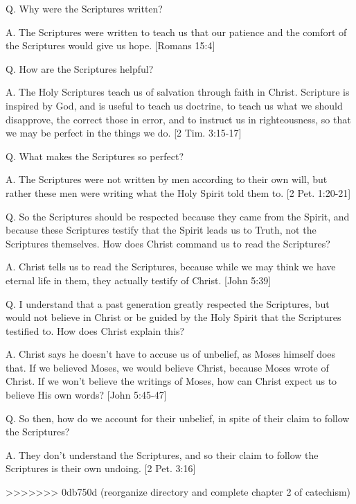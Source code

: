 \documentclass[../main.tex]{subfiles}
\begin{document}
	Q. Why were the Scriptures written?
	
	A. The Scriptures were written to teach us that our patience and the comfort of the Scriptures would give us hope. [Romans 15:4]
	
	Q. How are the Scriptures helpful?
	
	A. The Holy Scriptures teach us of salvation through faith in Christ. Scripture is inspired by God, and is useful to teach us doctrine, to teach us what we should disapprove, the correct those in error, and to instruct us in righteousness, so that we may be perfect in the things we do. [2 Tim. 3:15-17]
	
	Q. What makes the Scriptures so perfect?
	
	A. The Scriptures were not written by men according to their own will, but rather these men were writing what the Holy Spirit told them to. [2 Pet. 1:20-21]
	
	Q. So the Scriptures should be respected because they came from the Spirit, and because these Scriptures testify that the Spirit leads us to Truth, not the Scriptures themselves. How does Christ command us to read the Scriptures?
	
	A. Christ tells us to read the Scriptures, because while we may think we have eternal life in them, they actually testify of Christ. [John 5:39]
	
	Q. I understand that a past generation greatly respected the Scriptures, but would not believe in Christ or be guided by the Holy Spirit that the Scriptures testified to. How does Christ explain this?
	
	A. Christ says he doesn't have to accuse us of unbelief, as Moses himself does that. If we believed Moses, we would believe Christ, because Moses wrote of Christ. If we won't believe the writings of Moses, how can Christ expect us to believe His own words? [John 5:45-47]
	
	Q. So then, how do we account for their unbelief, in spite of their claim to follow the Scriptures?
	
	A. They don't understand the Scriptures, and so their claim to follow the Scriptures is their own undoing. [2 Pet. 3:16]
	
>>>>>>> 0db750d (reorganize directory and complete chapter 2 of catechism)
\end{document}
